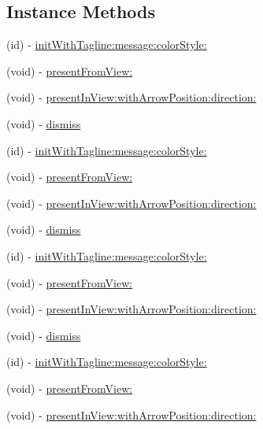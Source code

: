 \subsection*{Instance Methods}
\begin{DoxyCompactItemize}
\item 
(id) -\/ \hyperlink{interfaceFBTooltipView_a810fa96eb99ba7b3055b90e9214a401c}{init\+With\+Tagline\+:message\+:color\+Style\+:}
\item 
(void) -\/ \hyperlink{interfaceFBTooltipView_a1f30bcab68dad52738ab50fd37855984}{present\+From\+View\+:}
\item 
(void) -\/ \hyperlink{interfaceFBTooltipView_ae7b47d160c23b6a26bf42018b0e3a551}{present\+In\+View\+:with\+Arrow\+Position\+:direction\+:}
\item 
(void) -\/ \hyperlink{interfaceFBTooltipView_a569c1c43f92dd609d969f75bf151ae87}{dismiss}
\item 
(id) -\/ \hyperlink{interfaceFBTooltipView_a810fa96eb99ba7b3055b90e9214a401c}{init\+With\+Tagline\+:message\+:color\+Style\+:}
\item 
(void) -\/ \hyperlink{interfaceFBTooltipView_a1f30bcab68dad52738ab50fd37855984}{present\+From\+View\+:}
\item 
(void) -\/ \hyperlink{interfaceFBTooltipView_ae7b47d160c23b6a26bf42018b0e3a551}{present\+In\+View\+:with\+Arrow\+Position\+:direction\+:}
\item 
(void) -\/ \hyperlink{interfaceFBTooltipView_a569c1c43f92dd609d969f75bf151ae87}{dismiss}
\item 
(id) -\/ \hyperlink{interfaceFBTooltipView_a810fa96eb99ba7b3055b90e9214a401c}{init\+With\+Tagline\+:message\+:color\+Style\+:}
\item 
(void) -\/ \hyperlink{interfaceFBTooltipView_a1f30bcab68dad52738ab50fd37855984}{present\+From\+View\+:}
\item 
(void) -\/ \hyperlink{interfaceFBTooltipView_ae7b47d160c23b6a26bf42018b0e3a551}{present\+In\+View\+:with\+Arrow\+Position\+:direction\+:}
\item 
(void) -\/ \hyperlink{interfaceFBTooltipView_a569c1c43f92dd609d969f75bf151ae87}{dismiss}
\item 
(id) -\/ \hyperlink{interfaceFBTooltipView_a810fa96eb99ba7b3055b90e9214a401c}{init\+With\+Tagline\+:message\+:color\+Style\+:}
\item 
(void) -\/ \hyperlink{interfaceFBTooltipView_a1f30bcab68dad52738ab50fd37855984}{present\+From\+View\+:}
\item 
(void) -\/ \hyperlink{interfaceFBTooltipView_ae7b47d160c23b6a26bf42018b0e3a551}{present\+In\+View\+:with\+Arrow\+Position\+:direction\+:}

\end{DoxyCompactItemize}

